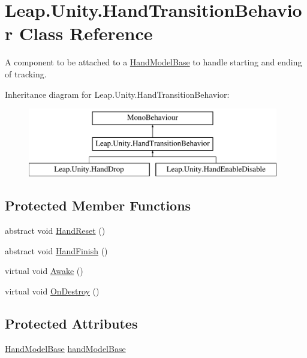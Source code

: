 \hypertarget{class_leap_1_1_unity_1_1_hand_transition_behavior}{}\section{Leap.\+Unity.\+Hand\+Transition\+Behavior Class Reference}
\label{class_leap_1_1_unity_1_1_hand_transition_behavior}


A component to be attached to a \mbox{\hyperlink{class_leap_1_1_unity_1_1_hand_model_base}{Hand\+Model\+Base}} to handle starting and ending of tracking.  


Inheritance diagram for Leap.\+Unity.\+Hand\+Transition\+Behavior\+:\begin{figure}[H]
\begin{center}
\leavevmode
\includegraphics[height=3.000000cm]{class_leap_1_1_unity_1_1_hand_transition_behavior}
\end{center}
\end{figure}
\subsection*{Protected Member Functions}
\begin{DoxyCompactItemize}
\item 
abstract void \mbox{\hyperlink{class_leap_1_1_unity_1_1_hand_transition_behavior_ae0a27730cfec3d323289ef7d4ef950d7}{Hand\+Reset}} ()
\item 
abstract void \mbox{\hyperlink{class_leap_1_1_unity_1_1_hand_transition_behavior_ab8668f229af94623ad378f456ae75326}{Hand\+Finish}} ()
\item 
virtual void \mbox{\hyperlink{class_leap_1_1_unity_1_1_hand_transition_behavior_ab9676a64c8b2ed72b1dd440c1f690c58}{Awake}} ()
\item 
virtual void \mbox{\hyperlink{class_leap_1_1_unity_1_1_hand_transition_behavior_a67061c97a527630c18621993e58d0207}{On\+Destroy}} ()
\end{DoxyCompactItemize}
\subsection*{Protected Attributes}
\begin{DoxyCompactItemize}
\item 
\mbox{\hyperlink{class_leap_1_1_unity_1_1_hand_model_base}{Hand\+Model\+Base}} \mbox{\hyperlink{class_leap_1_1_unity_1_1_hand_transition_behavior_aac308aa982a599388816ddc2d868c56e}{hand\+Model\+Base}}
\end{DoxyCompactItemize}


